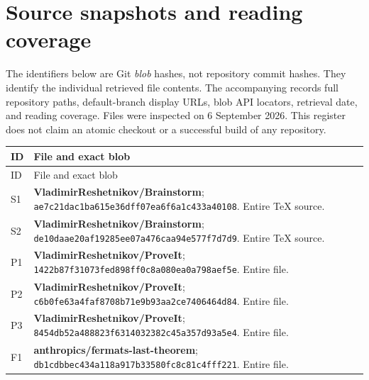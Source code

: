\documentclass[11pt,a4paper]{article}
\theoremstyle{plain}
\theoremstyle{definition}
\begin{document}
\section{Source snapshots and reading coverage}\label{app:sources}
The identifiers below are Git \emph{blob} hashes, not repository commit hashes. They identify the individual retrieved file contents. The accompanying  records full repository paths, default-branch display URLs, blob API locators, retrieval date, and reading coverage. Files were inspected on 6 September 2026. This register does not claim an atomic checkout or a successful build of any repository.

\begingroup\footnotesize
\begin{longtable}{@{}L{9mm}L{143mm}@{}}
\toprule ID & File and exact blob\\\midrule\endfirsthead
\toprule ID & File and exact blob\\\midrule\endhead
S1 & \textbf{VladimirReshetnikov/Brainstorm}; \newline \nolinkurl{ae7c21dac1ba615e36dff07ea6f6a1c433a40108}. Entire TeX source.\\[3pt]
S2 & \textbf{VladimirReshetnikov/Brainstorm}; \newline \nolinkurl{de10daae20af19285ee07a476caa94e577f7d7d9}. Entire TeX source.\\[3pt]
P1 & \textbf{VladimirReshetnikov/ProveIt}; \newline \nolinkurl{1422b87f31073fed898ff0c8a080ea0a798aef5e}. Entire file.\\[3pt]
P2 & \textbf{VladimirReshetnikov/ProveIt}; \newline \nolinkurl{c6b0fe63a4faf8708b71e9b93aa2ce7406464d84}. Entire file.\\[3pt]
P3 & \textbf{VladimirReshetnikov/ProveIt}; \newline \nolinkurl{8454db52a488823f6314032382c45a357d93a5e4}. Entire file.\\[3pt]
F1 & \textbf{anthropics/fermats-last-theorem}; \newline \nolinkurl{db1cdbbec434a118a917b33580fc8c81c4fff221}. Entire file.\\[3pt]

\end{longtable}
\end{document}
